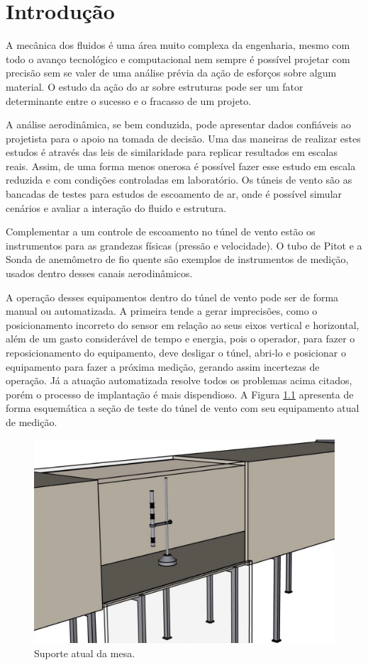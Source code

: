 \chapter{Introdução}\label{ch:introducao}
A mecânica dos fluidos é uma área muito complexa da engenharia, mesmo com todo o avanço tecnológico e computacional 
nem sempre é possível projetar com precisão sem se valer de uma análise prévia da ação de esforços sobre algum material.
O estudo da ação do ar sobre estruturas pode ser um fator determinante entre o sucesso e o fracasso de um projeto.

A análise aerodinâmica, se bem conduzida, pode apresentar dados confiáveis ao projetista para o apoio na tomada 
de decisão. Uma das maneiras de realizar estes estudos é através das leis de similaridade para replicar resultados em escalas reais. 
Assim, de uma forma menos onerosa é possível fazer esse estudo em escala reduzida e com condições controladas 
em laboratório. Os túneis de vento são as bancadas de testes para estudos de escoamento de ar, onde é possível simular cenários e avaliar a interação do fluido e estrutura.

Complementar a um controle de escoamento no túnel de vento estão os instrumentos para as grandezas físicas 
(pressão e velocidade). O tubo de Pitot e a Sonda de anemômetro de fio quente são exemplos de instrumentos 
de medição, usados dentro desses canais aerodinâmicos.

A operação desses equipamentos dentro do túnel de vento pode ser de forma manual ou automatizada. A primeira tende a 
gerar imprecisões, como o posicionamento incorreto do sensor em relação ao seus eixos vertical e horizontal, além de 
um gasto considerável de tempo e energia, pois o operador, para fazer o reposicionamento do equipamento, deve desligar 
o túnel, abri-lo e posicionar o equipamento para fazer a próxima medição, gerando assim incertezas de operação. Já a 
atuação automatizada resolve todos os problemas acima citados, porém o processo de implantação é mais dispendioso. 
A Figura \ref{fig:sisantigozoom} apresenta de forma esquemática a seção de teste do túnel de vento com 
seu equipamento atual de medição.

\begin{figure}[H]
\centering
\caption{Suporte atual da mesa.}\label{fig:sisantigozoom}
\includegraphics[scale = 0.33]{figuras/sisantigozoom}
\end{figure}

